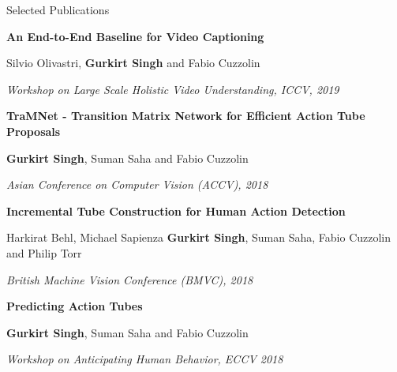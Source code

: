 \documentclass{resume} %
\begin{document}
\begin{rSection}{Selected Publications}
{\vspace{-0.04in}
\textbf{An End-to-End Baseline for Video Captioning}

\vspace{-0.1in}
\small{Silvio Olivastri, \textbf{Gurkirt Singh} and Fabio Cuzzolin}

\vspace{-0.1in}
\textit{\small{Workshop on Large Scale Holistic Video Understanding, ICCV, 2019}}


\vspace{-0.04in}
\textbf{TraMNet - Transition Matrix Network for Efficient Action Tube Proposals}

\vspace{-0.1in}
\small{\textbf{Gurkirt Singh}, Suman Saha and Fabio Cuzzolin}

\vspace{-0.1in}
\textit{\small{Asian Conference on Computer Vision (ACCV), 2018}}


\vspace{0.04in}
\textbf{Incremental Tube Construction for Human Action Detection}

\vspace{-0.1in}
\small{Harkirat Behl, Michael Sapienza \textbf{Gurkirt Singh}, Suman Saha, Fabio Cuzzolin and Philip Torr}

\vspace{-0.1in}
\textit{\small{British Machine Vision Conference (BMVC), 2018}}


\vspace{-0.04in}
\textbf{Predicting Action Tubes}

\vspace{-0.1in}
\small{\textbf{Gurkirt Singh}, Suman Saha and Fabio Cuzzolin}

\vspace{-0.1in}
\textit{\small{Workshop on Anticipating Human Behavior, ECCV 2018}}

}
\end{rSection}
\end{document}

